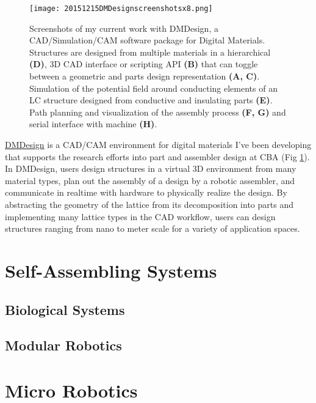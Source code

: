 {\begin{figure}
  \texttt{[image: 20151215DMDesignscreenshotsx8.png]}
  \caption{Screenshots of my current work with DMDesign, a CAD/Simulation/CAM software package for Digital Materials. Structures are designed from multiple materials in a hierarchical \textbf{(D)}, 3D CAD interface or scripting API \textbf{(B)} that can toggle between a geometric and parts design representation \textbf{(A, C)}. Simulation of the potential field around conducting elements of an LC structure designed from conductive and insulating parts \textbf{(E)}. Path planning and visualization of the assembly process \textbf{(F, G)} and serial interface with machine \textbf{(H)}.}
  \label{fig: designAssemblyGUIWide}
\end{figure}
\href{http://dma.cba.mit.edu/dmdesign/}{DMDesign} is a CAD/CAM environment for digital materials I've been developing that supports the research efforts into part and assembler design at CBA (Fig \ref{fig: designAssemblyGUIWide}).  In DMDesign, users design structures in a virtual 3D environment from many material types, plan out the assembly of a design by a robotic assembler, and communicate in realtime with hardware to physically realize the design\cite{LangfordWillGhassaeiAmandaGershenfeld2016}.  By abstracting the geometry of the lattice from its decomposition into parts and implementing many lattice types in the CAD workflow, users can design structures ranging from nano to meter scale for a variety of application spaces.

}

\section{Self-Assembling Systems}

\subsection{Biological Systems}

\subsection{Modular Robotics}

\section{Micro Robotics}
